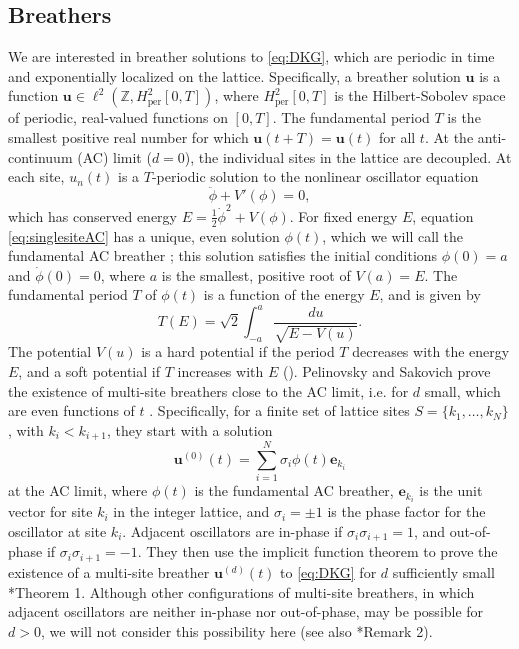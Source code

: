 \documentclass[12pt,reqno]{amsart}
\def\Z{{\mathbb Z}}
\def\per{\textrm{per}}
\newcommand{\evec}{\mathbf{e}}
\newcommand{\uvec}{\mathbf{u}}
\theoremstyle{definition}
\begin{document}
\subsection{Breathers}\label{sec:DKGbreather}

We are interested in breather solutions to \cref{eq:DKG}, which are periodic in time and exponentially localized on the lattice. Specifically, a breather solution $\uvec$ is a function $\uvec \in \ell^2(\Z, H^2_\per[0,T])$, where $H^2_\per[0,T]$ is the Hilbert-Sobolev space of periodic, real-valued functions on $[0,T]$. 
The fundamental period $T$ is the smallest positive real number for which $\uvec(t+T) = \uvec(t)$ for all $t$. At the anti-continuum (AC) limit ($d = 0$), the individual sites in the lattice are decoupled. At each site, $u_n(t)$ is a $T$-periodic solution to the nonlinear oscillator equation
\begin{equation}\label{eq:singlesiteAC}
\ddot{\phi} + V'(\phi) = 0,
\end{equation}
which has conserved energy $E = \frac{1}{2}\dot{\phi}^2 + V(\phi)$. For fixed energy $E$, equation \cref{eq:singlesiteAC} has a unique, even solution $\phi(t)$, which we will call the fundamental AC breather \cite{Pelinovsky2012}; this solution satisfies the initial conditions $\phi(0) = a$ and $\dot{\phi}(0) = 0$, where $a$ is the smallest, positive root of $V(a) = E$. The fundamental period $T$ of $\phi(t)$ is a function of the energy $E$, and is given by
\begin{equation}\label{eq:TE}
T(E) = \sqrt{2}\int_{-a}^a \frac{du}{\sqrt{E - V(u)}}.
\end{equation}
The potential $V(u)$ is a hard potential if the period $T$ decreases with the energy $E$, and a soft potential if $T$ increases with $E$ (\cites{Pelinovsky2012,cuevas-maraver2016}).
Pelinovsky and Sakovich prove the existence of multi-site breathers close to the AC limit, i.e. for $d$ small, which are even functions of $t$ \cite{Pelinovsky2012}. Specifically, for a finite set of lattice sites $S = \{ k_1, \dots, k_N \}$, with $k_i < k_{i+1}$, they start with a solution
\begin{equation}
\uvec^{(0)}(t) = \sum_{i=1}^N \sigma_i \phi(t) \evec_{k_i}
\end{equation}
at the AC limit, where $\phi(t)$ is the fundamental AC breather, $\evec_{k_i}$ is the unit vector for site $k_i$ in the integer lattice, and $\sigma_i = \pm 1$ is the phase factor for the oscillator at site $k_i$. Adjacent oscillators are in-phase if $\sigma_i \sigma_{i+1} = 1$, and out-of-phase if $\sigma_i \sigma_{i+1} = -1$. They then use the implicit function theorem to prove the existence of a multi-site breather $\uvec^{(d)}(t)$ to \cref{eq:DKG} for $d$ sufficiently small \cite{Pelinovsky2012}*{Theorem 1}. Although other configurations of multi-site breathers, in which adjacent oscillators are neither in-phase nor out-of-phase, may be possible for $d > 0$, we will not consider this possibility here (see also \cite{Pelinovsky2012}*{Remark 2}).
\end{document}
